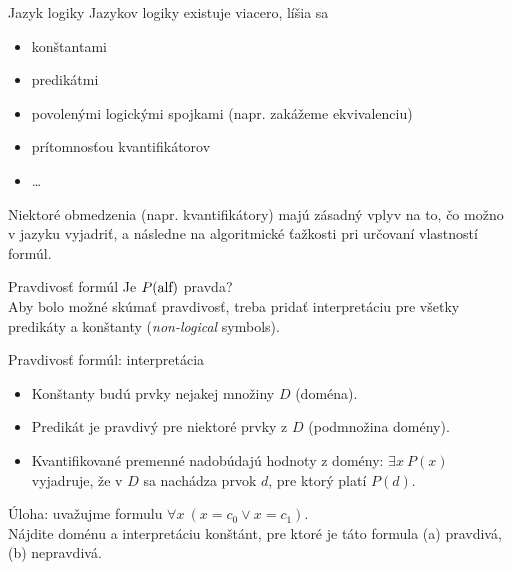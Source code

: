 \documentclass[12pt]{beamer}
\theoremstyle{definition}
\let\A\forall
\let\E\exists
\begin{document}
\begin{frame}{Jazyk logiky}
Jazykov logiky existuje viacero, líšia sa
\begin{itemize}
\item konštantami
\item predikátmi
\item povolenými logickými spojkami (napr. zakážeme ekvivalenciu)
\item prítomnosťou kvantifikátorov
\item \dots
\end{itemize}
Niektoré obmedzenia (napr. kvantifikátory) majú zásadný vplyv na to, čo možno v jazyku vyjadriť, a následne na algoritmické ťažkosti pri určovaní vlastností formúl.
\end{frame}

\begin{frame}{Pravdivosť formúl}
Je $P(\hbox{alf})$ pravda?\\[5mm]
Aby bolo možné skúmať pravdivosť, treba pridať \alert{interpretáciu} pre všetky predikáty a konštanty (\emph{non-logical} symbols).
\end{frame}

\begin{frame}{Pravdivosť formúl: interpretácia}
\begin{itemize}
\item Konštanty budú prvky nejakej množiny $D$ (doména).
\pause
\item Predikát je pravdivý pre niektoré prvky z $D$ (podmnožina domény).
\pause
\item Kvantifikované premenné nadobúdajú hodnoty z domény:
	$\E x\ P(x)$ vyjadruje, že v $D$ sa nachádza prvok $d$, pre ktorý platí $P(d)$.
\end{itemize}
\pause
\vspace*{3mm}
Úloha: uvažujme formulu $\A x\ (x = c_0 \lor x = c_1)$.\\
Nájdite doménu a interpretáciu konštánt, pre ktoré je táto formula
(a) pravdivá, (b) nepravdivá.
\end{frame}
\end{document}
